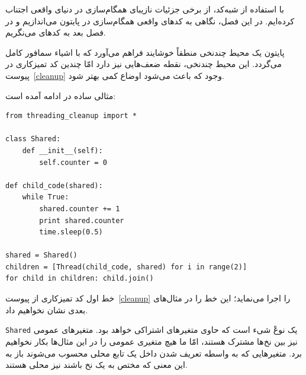 \documentclass{book}
\begin{document}
    با استفاده از شبه‌کد، از برخی جزئیات نازیبای همگام‌سازی در دنیای واقعی اجتناب کرده‌ایم. 
    در این فصل، نگاهی به کدهای واقعی همگام‌سازی در پایتون می‌اندازیم و در فصل بعد به کدهای  می‌نگریم. 

    پایتون یک محیط چندنخی منطقاً خوشایند فراهم می‌آورد که با اشیاء سمافور کامل می‌گردد. این محیط چندنخی، نقطه ضعف‌هایی نیز دارد امّا 
    چندین کد  تمیزکاری در پیوست~\ref{cleanup} وجود که باعث می‌شود اوضاع کمی بهتر شود. 
    

    مثالی ساده در ادامه آمده است: 

\begin{latin}
\begin{lstlisting}
from threading_cleanup import *

class Shared:
    def __init__(self):
        self.counter = 0

def child_code(shared):
    while True:
        shared.counter += 1
        print shared.counter
        time.sleep(0.5)

shared = Shared()
children = [Thread(child_code, shared) for i in range(2)]
for child in children: child.join()
\end{lstlisting}
\end{latin}

    خط اول کد تمیزکاری از پیوست~\ref{cleanup} را اجرا می‌نماید؛ این خط را در مثال‌های بعدی نشان نخواهیم داد. 

    {\tt Shared}  
    یک نوعْ شیء است که حاوی متغیرهای اشتراکی خواهد بود. متغیرهای عمومی نیز بین نخ‌ها مشترک هستند، 
    امّا ما هیچ متغیری عمومی‌ را در این مثال‌ها بکار نخواهیم برد. متغیرهایی که به واسطه تعریف شدن داخل یک تابع محلی محسوب می‌شوند 
    باز به این معنی که مختص به یک نخ باشند نیز محلی هستند.
\end{document}
